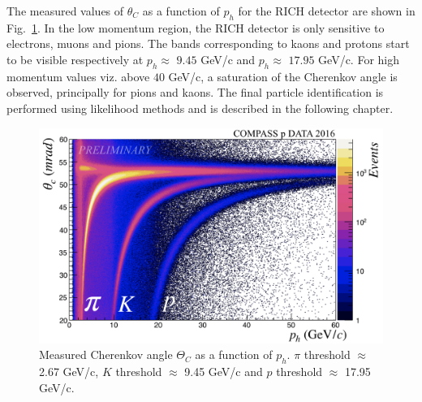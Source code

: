 The measured values of $\theta_C$ as a function of $p_h$ for the RICH detector are shown in Fig.~\ref{pic:RICH}. In the low momentum region, the RICH detector is only sensitive to electrons, muons and pions. The bands corresponding to kaons and protons start to be visible respectively at $p_h \approx$ $9.45$ GeV/c and $p_h \approx$ $17.95$ GeV/c. For high momentum values viz. above $40$ GeV/c, a saturation of the Cherenkov angle is observed, principally for pions and kaons. The final particle identification is performed using likelihood methods and is described in the following chapter.

\begin{figure}[!h]
  \centering
	\includegraphics[scale=0.5]{./gfx/RICH.png}
	\caption{Measured Cherenkov angle $\Theta_C$ as a function of $p_h$. $\pi$ threshold $\approx$ 2.67 GeV/c, $K$ threshold $\approx$ 9.45 GeV/c and $p$ threshold $\approx$ 17.95 GeV/c.}
	\label{pic:RICH}
\end{figure}
